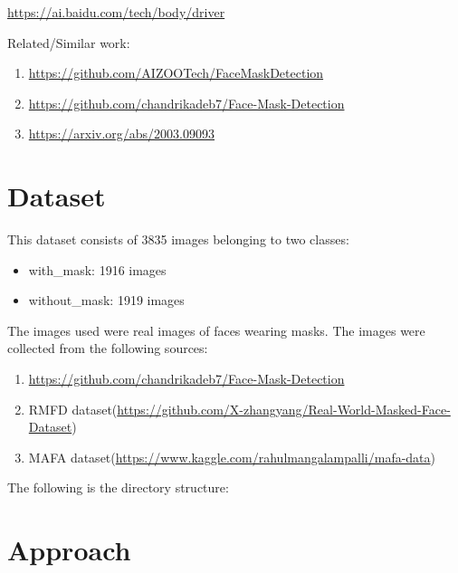 \documentclass{article}
\begin{document}
\url{https://ai.baidu.com/tech/body/driver}


Related/Similar work:
\begin{enumerate}
  \item \url{https://github.com/AIZOOTech/FaceMaskDetection}
  \item \url{https://github.com/chandrikadeb7/Face-Mask-Detection}
  \item \url{https://arxiv.org/abs/2003.09093}
\end{enumerate}

\section{Dataset}
This dataset consists of 3835 images belonging to two classes:
\begin{itemize}
  \item with\_mask: 1916 images
  \item without\_mask: 1919 images
\end{itemize}
The images used were real images of faces wearing masks. The images were collected from the following sources:
\begin{enumerate}
  \item \url{https://github.com/chandrikadeb7/Face-Mask-Detection}
  \item RMFD dataset(\url{https://github.com/X-zhangyang/Real-World-Masked-Face-Dataset})
  \item MAFA dataset(\url{https://www.kaggle.com/rahulmangalampalli/mafa-data})
\end{enumerate}
The following is the directory structure:
\DTsetlength{0.2em}{1em}{0.2em}{1pt}{3pt}

\section{Approach}
\end{document}
